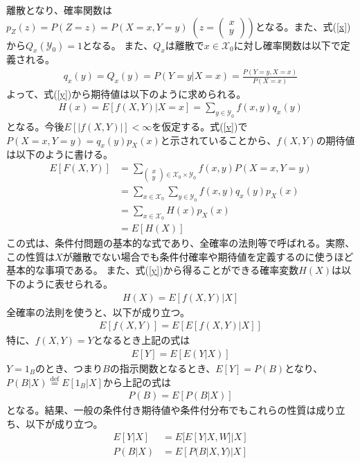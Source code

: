 \documentclass[a4j,12pt]{jarticle}
\begin{document}
離散となり、確率関数は$p_{Z}(z) = P(Z = z) = P(X = x,Y =y) \; (z = \left(\begin{array}{c}x \\ y\end{array} \right))$となる。また、式(\ref{x})から$Q_{x}(\mathcal{Y}_{0}) = 1$となる。
また、$Q_{x}$は離散で$x \in \mathcal{X}_{0}$に対し確率関数は以下で定義される。
\begin{align}
\label{v}
q_{x}(y) = Q_{x}({y}) = P(Y = y|X=x) = \frac{P(Y = y,X = x)}{P(X=x)}
\end{align}
よって、式(\ref{y})から期待値は以下のように求められる。
\begin{align*}
H(x) = E[f(X,Y) | X = x] = \sum_{y \in \mathcal{Y}_{0}}f(x,y)q_{x}(y)
\end{align*}
となる。今後$E[|f(X,Y)|] < \infty$を仮定する。式(\ref{v})で$P(X = x,Y = y) = q_{x}(y)p_{X}(x)$と示されていることから、$f(X,Y)$の期待値は以下のように書ける。
\begin{align*}
E[F(X,Y)] &= \sum_{\left(\begin{array}{c}x \\ y \end{array}\right) \in \mathcal{X}_{0}\times\mathcal{Y}_{0}}f(x,y)P(X = x,Y = y) \\
          &= \sum_{x\in \mathcal{X}_{0}}\sum_{y \in \mathcal{Y}_{0}}f(x,y)q_{x}(y)p_{X}(x) \\
          &= \sum_{x \in \mathcal{X}_{0}}H(x)p_{X}(x) \\
          &= E[H(X)]
\end{align*}
この式は、条件付問題の基本的な式であり、全確率の法則等で呼ばれる。実際、この性質は$X$が離散でない場合でも条件付確率や期待値を定義するのに使うほど基本的な事項である。
また、式(\ref{y})から得ることができる確率変数$H(X)$は以下のように表せられる。
\begin{align*}
H(X) = E[f(X,Y)|X]
\end{align*}
全確率の法則を使うと、以下が成り立つ。
\begin{align*}
E[f(X,Y)] = E[E[f(X,Y)|X]]
\end{align*}
特に、$f(X,Y) = Y$となるとき上記の式は
\begin{align*}
E[Y] = E[E(Y|X)]
\end{align*}
$Y = 1_{B}$のとき、つまり$B$の指示関数となるとき、$E[Y] = P(B)$となり、$P(B|X) \stackrel{\mathrm{def}}{=} E[1_{B}|X]$から上記の式は
\begin{align*}
P(B) = E[P(B|X)]
\end{align*}
となる。結果、一般の条件付き期待値や条件付分布でもこれらの性質は成り立ち、以下が成り立つ。
\begin{align}
E[Y|X] &= E[E[Y|X,W]|X] \\
P(B|X) &= E[P(B|X,Y)|X] \nonumber
\end{align}
\end{document}
